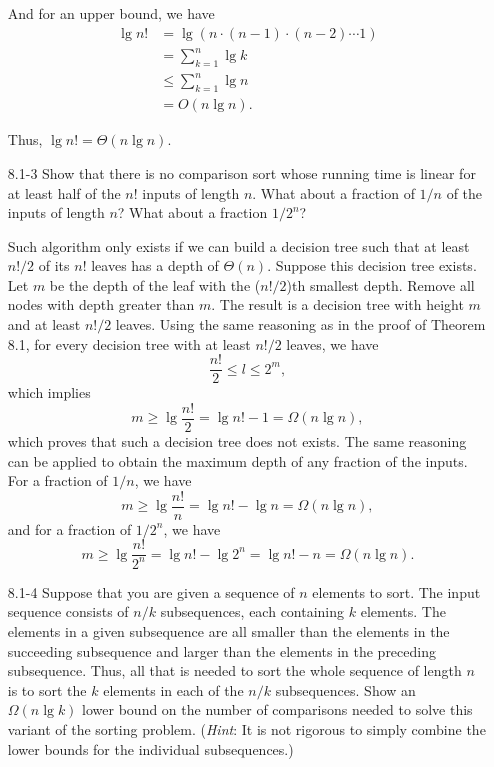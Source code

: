 \documentclass{report}
\makeatletter
\renewenvironment{framed}{%
 \def\FrameCommand##1{\hskip\@totalleftmargin
 \fboxsep=\FrameSep\fbox{##1}}%
 \MakeFramed {\advance\hsize-\width
   \@totalleftmargin\z@ \linewidth\hsize
   \@setminipage}}%
 {\par\unskip\endMakeFramed}
\makeatother
\begin{document}
\begin{enumerate}
\begin{framed}
And for an upper bound, we have
\begin{equation*}
\begin{aligned}
  \lg{n!} &=   \lg(n \cdot (n - 1) \cdot (n - 2) \cdots 1)\\
          &=   \sum_{k = 1}^{n} \lg k\\
          &\le \sum_{k = 1}^{n} \lg n\\
          &=   O(n \lg n).
\end{aligned}
\end{equation*}

Thus, $\lg n! = \Theta(n \lg n)$.
\end{framed}

\newpage

\item[8.1{-}3]{Show that there is no comparison sort whose running time is
linear for at least half of the $n!$ inputs of length $n$. What about a fraction
of $1/n$ of the inputs of length $n$?  What about a fraction $1/2^n$?}

\begin{framed}
Such algorithm only exists if we can build a decision tree such that at least
$n!/2$ of its $n!$ leaves has a depth of $\Theta(n)$. Suppose this decision tree
exists. Let $m$ be the depth of the leaf with the ($n!/2$)th smallest depth.
Remove all nodes with depth greater than $m$. The result is a decision tree
with height $m$ and at least $n!/2$ leaves. Using the same reasoning as in the
proof of Theorem 8.1, for every decision tree with at least $n!/2$ leaves, we
have
\[
  \frac{n!}{2} \le l \le 2^{m},
\]
which implies
\[
  m \ge \lg \frac{n!}{2} = \lg n! - 1 = \Omega(n \lg n),
\]
which proves that such a decision tree does not exists. The same reasoning can
be applied to obtain the maximum depth of any fraction of the inputs. For
a fraction of $1/n$, we have
\[
  m \ge \lg \frac{n!}{n} = \lg n! - \lg n = \Omega(n \lg n),
\]
and for a fraction of $1/2^n$, we have
\[
  m \ge \lg \frac{n!}{2^n} = \lg n! - \lg 2^n = \lg n! - n = \Omega(n \lg n).
\]
\end{framed}

\item[8.1{-}4]{Suppose that you are given a sequence of $n$ elements to sort.
The input sequence consists of $n/k$ subsequences, each containing $k$ elements.
The elements in a given subsequence are all smaller than the elements in the
succeeding subsequence and larger than the elements in the preceding
subsequence. Thus, all that is needed to sort the whole sequence of length
$n$ is to sort the $k$ elements in each of the $n/k$ subsequences. Show an
$\Omega(n \lg k)$ lower bound on the number of comparisons needed to solve this
variant of the sorting problem. (\emph{Hint}: It is not rigorous to simply
combine the lower bounds for the individual subsequences.)}


\end{enumerate}
\end{document}
